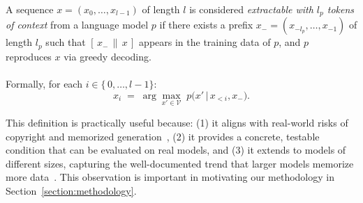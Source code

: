 \begin{definition}
\label{definition:memorization}
A sequence \(x = (x_0, \ldots, x_{l-1})\) of length \(l\) is considered \emph{extractable with \(l_p\) tokens of context} from a language model \(p\) if there exists a prefix \(x_{-} = (x_{-l_p}, \ldots, x_{-1})\) of length \(l_p\) such that 
\([\,x_{-} \,\|\, x\,]\) appears in the training data of \(p\), and \(p\) reproduces \(x\) via greedy decoding. 
\\
\\
Formally, for each \(i \in \{\,0,\ldots,l-1\}\):
\[
x_i \;=\;
\arg\max_{x' \in \mathcal{V}} \; p\bigl(x' \,|\, x_{<i},x_{-}\bigr).
\]
\end{definition}
%
%

This definition is practically useful because: (1) it aligns with real-world risks of copyright and memorized generation~\citep{nasr2311scalable, karamolegkou2023copyright}, (2) it provides a concrete, testable condition that can be evaluated on real models, and (3) it extends to models of different sizes, capturing the well-documented trend that larger models memorize more data~\citep{carlini2022quantifying}. This observation is important in motivating our methodology in Section~\ref{section:methodology}.

